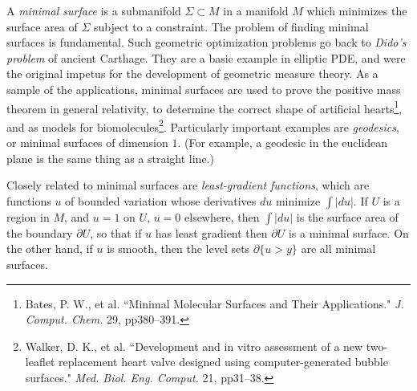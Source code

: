\documentclass[12pt]{article}
\begin{document}
%
%
%
%
%
%
A \emph{minimal surface} is a submanifold $\Sigma \subset M$ in a manifold $M$ which minimizes the surface area of $\Sigma$ subject to a constraint.
The problem of finding minimal surfaces is fundamental.
Such geometric optimization problems go back to \emph{Dido's problem} of ancient Carthage.
They are a basic example in elliptic PDE, and were the original impetus for the development of geometric measure theory.
As a sample of the applications, minimal surfaces are used to prove the positive mass theorem in general relativity, to determine the correct shape of artificial hearts\footnote{Bates, P. W., et al. ``Minimal Molecular Surfaces and Their Applications." \emph{J. Comput. Chem.} 29, pp380--391.}, and as models for biomolecules\footnote{Walker, D. K., et al. ``Development and in vitro assessment of a new two-leaflet replacement heart valve designed using computer-generated bubble surfaces." \emph{Med. Biol. Eng. Comput.} 21, pp31--38.}.
Particularly important examples are \emph{geodesics}, or minimal surfaces of dimension $1$.
(For example, a geodesic in the euclidean plane is the same thing as a straight line.)

Closely related to minimal surfaces are \emph{least-gradient functions}, which are functions $u$ of bounded variation whose derivatives $du$ minimize $\int |du|$.
If $U$ is a region in $M$, and $u = 1$ on $U$, $u = 0$ elsewhere, then $\int |du|$ is the surface area of the boundary $\partial U$, so that if $u$ has least gradient then $\partial U$ is a minimal surface.
On the other hand, if $u$ is smooth, then the level sets $\partial \{u > y\}$ are all minimal surfaces.
\end{document}
